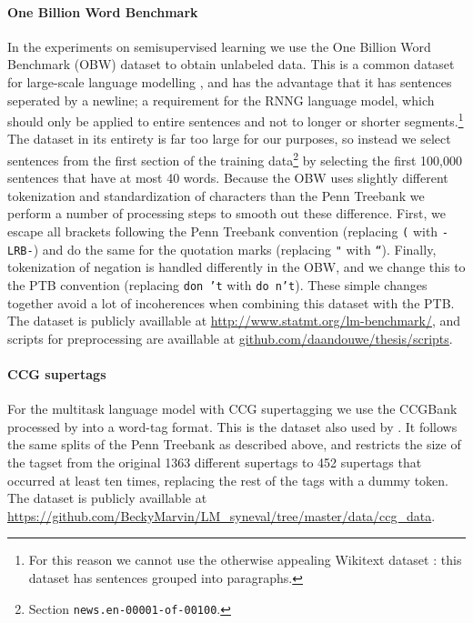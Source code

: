     \paragraph{One Billion Word Benchmark}
    In the experiments on semisupervised learning we use the One Billion Word Benchmark (OBW) dataset \citep{chelba2013one} to obtain unlabeled data. This is a common dataset for large-scale language modelling \citep{jozefowicz2016exploring}, and has the advantage that it has sentences seperated by a newline; a requirement for the RNNG language model, which should only be applied to entire sentences and not to longer or shorter segments.\footnote{For this reason we cannot use the otherwise appealing Wikitext dataset \citep{merity2016pointer}: this dataset has sentences grouped into paragraphs.} The dataset in its entirety is far too large for our purposes, so instead we select sentences from the first section of the training data\footnote{Section \texttt{news.en-00001-of-00100}.} by selecting the first 100,000 sentences that have at most 40 words. Because the OBW uses slightly different tokenization and standardization of characters than the Penn Treebank we perform a number of processing steps to smooth out these difference. First, we escape all brackets following the Penn Treebank convention (replacing \texttt{(} with \texttt{-LRB-}) and do the same for the quotation marks (replacing \texttt{"} with \texttt{``}). Finally, tokenization of negation is handled differently in the OBW, and we change this to the PTB convention (replacing \texttt{don 't} with \texttt{do n't}). These simple changes together avoid a lot of incoherences when combining this dataset with the PTB. The dataset is publicly availlable at \url{http://www.statmt.org/lm-benchmark/}, and scripts for preprocessing are availlable at \url{github.com/daandouwe/thesis/scripts}.

    \paragraph{CCG supertags}
    For the multitask language model with CCG supertagging we use the CCGBank \citep{hockenmaier2007ccgbank} processed by \citet{enguehard2017multitask} into a word-tag format. This is the dataset also used by \citet{linzen2018targeted}. It follows the same splits of the Penn Treebank as described above, and restricts the size of the tagset from the original 1363 different supertags to 452 supertags that occurred at least ten times, replacing the rest of the tags with a dummy token. The dataset is publicly availlable at \url{https://github.com/BeckyMarvin/LM_syneval/tree/master/data/ccg_data}.

